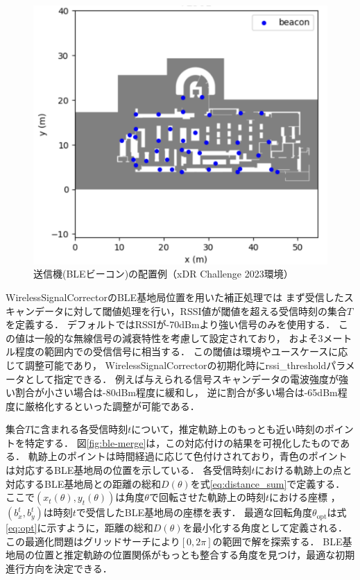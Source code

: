 \begin{figure}[H]
    \centering
    \includegraphics[width=\linewidth]{../image/ble-beacon-position.jpg}
    \caption{送信機(BLEビーコン)の配置例（xDR Challenge 2023環境）}    \label{fig:ble-beacon-position}
\end{figure}


WirelessSignalCorrectorのBLE基地局位置を用いた補正処理では
まず受信したスキャンデータに対して閾値処理を行い，RSSI値が閾値を超える受信時刻の集合$T$を定義する．
デフォルトではRSSIが-70dBmより強い信号のみを使用する．
この値は一般的な無線信号の減衰特性を考慮して設定されており，
およそ3メートル程度の範囲内での受信信号に相当する．
この閾値は環境やユースケースに応じて調整可能であり，
WirelessSignalCorrectorの初期化時にrssi\_thresholdパラメータとして指定できる．
例えば与えられる信号スキャンデータの電波強度が強い割合が小さい場合は-80dBm程度に緩和し，
逆に割合が多い場合は-65dBm程度に厳格化するといった調整が可能である．

集合$T$に含まれる各受信時刻$t$について，推定軌跡上のもっとも近い時刻のポイントを特定する．
図\ref{fig:ble-merge}は，この対応付けの結果を可視化したものである．
軌跡上のポイントは時間経過に応じて色付けされており，青色のポイントは対応するBLE基地局の位置を示している．
各受信時刻$t$における軌跡上の点と対応するBLE基地局との距離の総和$D(\theta)$を式\eqref{eq:distance_sum}で定義する．
ここで$(x_t(\theta), y_t(\theta))$は角度$\theta$で回転させた軌跡上の時刻$t$における座標
，$(b_x^t, b_y^t)$は時刻$t$で受信したBLE基地局の座標を表す．
最適な回転角度$\theta_{\mathrm{opt}}$は式\eqref{eq:opt}に示すように，距離の総和$D(\theta)$を最小化する角度として定義される．この最適化問題はグリッドサーチにより$[0, 2\pi]$の範囲で解を探索する．
BLE基地局の位置と推定軌跡の位置関係がもっとも整合する角度を見つけ，最適な初期進行方向を決定できる．

